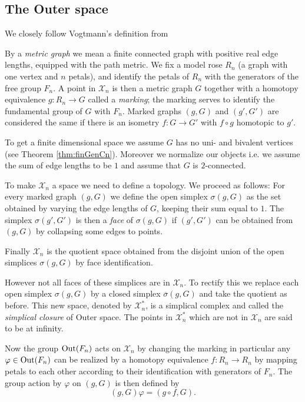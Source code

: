 \subsection{The Outer space}
We closely follow Vogtmann's definition from \cite[p. 2 ff.]{vogtmann16}
\begin{definition}
	By a \emph{metric graph} we mean a finite connected graph with positive real edge lengths, equipped with the path metric.
	We fix a model rose $R_{n}$ (a graph with one vertex and $n$ petals), and identify the petals of $R_{n}$ with the generators
	of the free group $F_{n}$. A point in $\mathcal{X}_{n}$ is then a metric graph $G$ together with a homotopy
	equivalence $g: R_{n} \to  G$ called a \emph{marking}; the marking serves to identify the fundamental group of $G$ with $F_{n}$.
	Marked graphs $(g,G)$ and $(g',G')$ are considered the same if there is an isometry  $f: G \to G'$ with $f \circ g$ homotopic to $g'$.

	To get a finite dimensional space we assume $G$ has no uni- and bivalent vertices (see Theorem \ref{thm:finGenCn}).
	Moreover we normalize our objects i.e. we assume the sum of edge lengths to be $1$ and assume that $G$ is $2$-connected.
\end{definition}
To make  $\mathcal{X}_{n}$ a space we need to define a topology. We proceed as follows: 
For every marked graph $(g,G)$ we define the open simplex $\sigma(g,G)$ as the set obtained by varying the edge lengths of $G$,
keeping their sum equal to $1$.
The simplex  $\sigma(g',G')$ is then a \emph{face} of $\sigma(g,G)$ if $(g',G')$ can be obtained from $(g,G)$ by collapsing some edges to points.

Finally $\mathcal{X}_{n}$ is the quotient space obtained from the disjoint union of the open simplices $\sigma(g,G)$ by face identification.

However not all faces of these simplices are in $\mathcal{X}_{n}$.
To rectify this we replace each open simplex $\sigma(g,G)$ by a closed simplex $\overline{\sigma}(g,G)$ and take
the quotient as before. This new space, denoted by $\mathcal{X}^{*}_{n}$, is a simplical complex and called the \emph{simplical closure} of Outer space.
The points in $\mathcal{X}^{*}_{n}$ which are not in $\mathcal{X}_{n}$ are said to be at infinity.

 Now the group $\operatorname{Out}(F_{n})$ acts on $\mathcal{X}_{n}$ by changing the marking in particular
 any $\varphi \in \operatorname{Out}(F_{n})$ can be realized by a homotopy equivalence $f: R_{n} \to R_{n}$
 by mapping petals to each other according to their identification with generators of $F_{n}$.
 The group action by $\varphi$ on $(g,G)$ is then defined by
 \[
	 (g,G) \varphi = (g \circ f, G)
 .\] 

